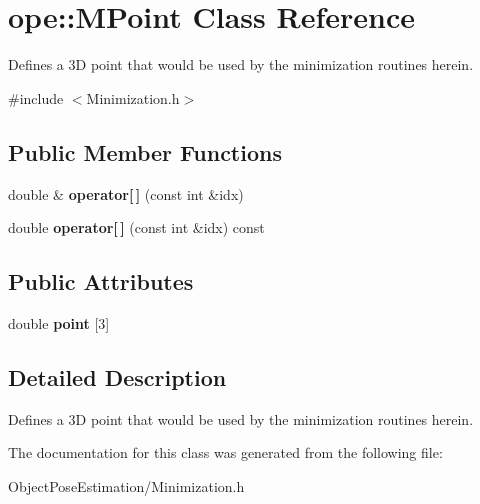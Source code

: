 \hypertarget{classope_1_1_m_point}{\section{ope\-:\-:M\-Point Class Reference}
\label{classope_1_1_m_point}
}


Defines a 3\-D point that would be used by the minimization routines herein.  




{\ttfamily \#include $<$Minimization.\-h$>$}

\subsection*{Public Member Functions}
\begin{DoxyCompactItemize}
\item 
\hypertarget{classope_1_1_m_point_a13dbcc3f5cf9edf28f5ecd86329d486d}{double \& {\bfseries operator\mbox{[}$\,$\mbox{]}} (const int \&idx)}\label{classope_1_1_m_point_a13dbcc3f5cf9edf28f5ecd86329d486d}

\item 
\hypertarget{classope_1_1_m_point_a4b5d072821594277437d3c64d950c343}{double {\bfseries operator\mbox{[}$\,$\mbox{]}} (const int \&idx) const }\label{classope_1_1_m_point_a4b5d072821594277437d3c64d950c343}

\end{DoxyCompactItemize}
\subsection*{Public Attributes}
\begin{DoxyCompactItemize}
\item 
\hypertarget{classope_1_1_m_point_a5115d616f47ef8585d395e38537dc624}{double {\bfseries point} \mbox{[}3\mbox{]}}\label{classope_1_1_m_point_a5115d616f47ef8585d395e38537dc624}

\end{DoxyCompactItemize}


\subsection{Detailed Description}
Defines a 3\-D point that would be used by the minimization routines herein. 

The documentation for this class was generated from the following file\-:\begin{DoxyCompactItemize}
\item 
Object\-Pose\-Estimation/Minimization.\-h\end{DoxyCompactItemize}
